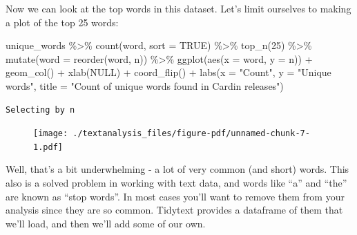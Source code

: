 \documentclass[
  letterpaper,
  DIV=11,
  numbers=noendperiod]{scrreprt}
\newenvironment{Shaded}{\begin{snugshade}}{\end{snugshade}}
\newcommand{\AttributeTok}[1]{\textcolor[rgb]{0.40,0.45,0.13}{#1}}
\newcommand{\ConstantTok}[1]{\textcolor[rgb]{0.56,0.35,0.01}{#1}}
\newcommand{\DecValTok}[1]{\textcolor[rgb]{0.68,0.00,0.00}{#1}}
\newcommand{\FunctionTok}[1]{\textcolor[rgb]{0.28,0.35,0.67}{#1}}
\newcommand{\NormalTok}[1]{\textcolor[rgb]{0.00,0.23,0.31}{#1}}
\newcommand{\SpecialCharTok}[1]{\textcolor[rgb]{0.37,0.37,0.37}{#1}}
\newcommand{\StringTok}[1]{\textcolor[rgb]{0.13,0.47,0.30}{#1}}
\begin{document}
Now we can look at the top words in this dataset. Let's limit ourselves
to making a plot of the top 25 words:

\begin{Shaded}
\begin{Highlighting}[]
\NormalTok{unique\_words }\SpecialCharTok{\%\textgreater{}\%}
  \FunctionTok{count}\NormalTok{(word, }\AttributeTok{sort =} \ConstantTok{TRUE}\NormalTok{) }\SpecialCharTok{\%\textgreater{}\%}
  \FunctionTok{top\_n}\NormalTok{(}\DecValTok{25}\NormalTok{) }\SpecialCharTok{\%\textgreater{}\%}
  \FunctionTok{mutate}\NormalTok{(}\AttributeTok{word =} \FunctionTok{reorder}\NormalTok{(word, n)) }\SpecialCharTok{\%\textgreater{}\%}
  \FunctionTok{ggplot}\NormalTok{(}\FunctionTok{aes}\NormalTok{(}\AttributeTok{x =}\NormalTok{ word, }\AttributeTok{y =}\NormalTok{ n)) }\SpecialCharTok{+}
  \FunctionTok{geom\_col}\NormalTok{() }\SpecialCharTok{+}
  \FunctionTok{xlab}\NormalTok{(}\ConstantTok{NULL}\NormalTok{) }\SpecialCharTok{+}
  \FunctionTok{coord\_flip}\NormalTok{() }\SpecialCharTok{+}
      \FunctionTok{labs}\NormalTok{(}\AttributeTok{x =} \StringTok{"Count"}\NormalTok{,}
      \AttributeTok{y =} \StringTok{"Unique words"}\NormalTok{,}
      \AttributeTok{title =} \StringTok{"Count of unique words found in Cardin releases"}\NormalTok{)}
\end{Highlighting}
\end{Shaded}

\begin{verbatim}
Selecting by n
\end{verbatim}

\begin{figure}[H]

{\centering \texttt{[image: ./textanalysis\_files/figure-pdf/unnamed-chunk-7-1.pdf]}

}

\end{figure}

Well, that's a bit underwhelming - a lot of very common (and short)
words. This also is a solved problem in working with text data, and
words like ``a'' and ``the'' are known as ``stop words''. In most cases
you'll want to remove them from your analysis since they are so common.
Tidytext provides a dataframe of them that we'll load, and then we'll
add some of our own.
\end{document}
